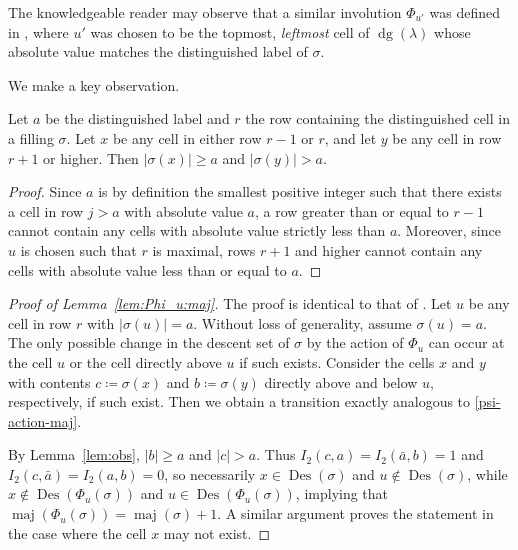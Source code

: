 \documentclass[ALCO,Unicode]{cedram}
\DeclareMathOperator{\dg}{dg}
\DeclareMathOperator{\maj}{maj}
\DeclareMathOperator{\Des}{Des}
\begin{document}
\begin{remark} 
The knowledgeable reader may observe that a similar involution $\Phi_{u'}$ was
defined in \cite[Section 5.2]{HHL05}, where $u'$ was chosen to be the topmost, \emph{leftmost} cell of $\dg(\lambda)$ whose absolute value matches the distinguished label of $\sigma$. 
\end{remark}


We make a key observation. 
\begin{lemma}\label{lem:obs}
Let $a$ be the distinguished label and $r$ the row containing the distinguished cell in a filling $\sigma$. Let $x$ be any cell in either row $r-1$ or $r$, and let $y$ be any cell in row $r+1$ or higher. Then $|\sigma(x)|\geq a$ and $|\sigma(y)|>a$.
\end{lemma}
\begin{proof}
Since $a$ is by definition the smallest positive integer such that there exists a cell in row $j>a$ with absolute value $a$, a row greater than or equal to $r-1$ cannot contain any cells with absolute value strictly less than $a$. Moreover, since $u$ is chosen such that $r$ is maximal, rows $r+1$ and higher cannot contain any cells with absolute value less than or equal to $a$. 
\end{proof}

\begin{proof}[Proof of Lemma~\ref{lem:Phi_u:maj}]
The proof is identical to that of \cite[Lemma 5.2]{HHL05}. Let $u$ be any cell in row $r$ with $|\sigma(u)|=a$. Without loss of generality, assume $\sigma(u)=a$. The only possible change in the descent set of $\sigma$ by the action of $\Phi_u$ can occur at the cell $u$ or the cell directly above $u$ if such exists. 
Consider the cells $x$ and $y$ with contents $c\coloneqq\sigma(x)$ and $b\coloneqq\sigma(y)$ directly above and below $u$, respectively, if such exist. 
Then we obtain a transition exactly analogous to \eqref{psi-action-maj}.

By Lemma~\ref{lem:obs}, $|b| \geq a$ and $|c| > a$. Thus $I_2(c,a)=I_2(\bar{a},b)=1$ and $I_2(c,\bar{a})=I_2(a,b)=0$, so necessarily $x\in\Des(\sigma)$ and $u\not\in\Des(\sigma)$, while $x\not\in\Des(\Phi_u(\sigma))$ and $u\in\Des(\Phi_u(\sigma))$, implying that $\maj(\Phi_u(\sigma))=\maj(\sigma)+1$. A similar argument proves the statement in the case where the cell $x$ may not exist.
\end{proof}
\end{document}
